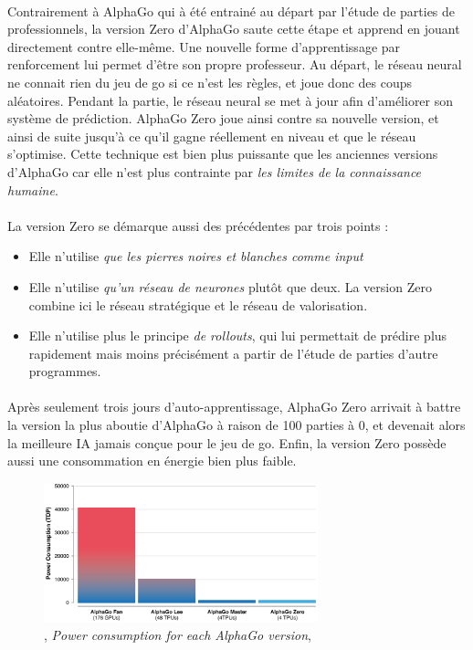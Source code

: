 \paragraph{} Contrairement à AlphaGo qui à été entrainé au départ par l'étude de parties de professionnels, la version Zero d'AlphaGo saute
cette étape et apprend en jouant directement contre elle-même. Une nouvelle forme \cite{AlphaGo2} d'apprentissage par renforcement lui permet
d'être son propre professeur. Au départ, le réseau neural ne connait rien du jeu de go si ce n'est les règles, et joue donc des coups aléatoires.
Pendant la partie, le réseau neural se met à jour afin d'améliorer son système de prédiction. AlphaGo Zero joue ainsi contre sa nouvelle version,
et ainsi de suite jusqu'à ce qu'il gagne réellement en niveau et que le réseau s'optimise. Cette technique est bien plus puissante que les anciennes
versions d'AlphaGo car elle n'est plus contrainte par \emph{les limites de la connaissance humaine}. 

\paragraph{} La version Zero se démarque aussi des précédentes par trois points :

\begin{itemize}
    \item Elle n'utilise \emph{que les pierres noires et blanches comme input}
    \item Elle n'utilise \emph{qu'un réseau de neurones} plutôt que deux. La version Zero combine ici le réseau stratégique et le réseau de valorisation.
    \item Elle n'utilise plus le principe \emph{de rollouts}, qui lui permettait de prédire plus rapidement mais moins précisément a partir de l'étude de parties d'autre programmes. 
\end{itemize}

\paragraph{} Après seulement trois jours d'auto-apprentissage, AlphaGo Zero arrivait à battre la version la plus aboutie d'AlphaGo à raison de 100 parties à 0,
et devenait alors la meilleure IA jamais conçue pour le jeu de go. Enfin, la version Zero possède aussi une consommation en énergie bien plus faible.

\begin{figure}[h]
    \centering
    \includegraphics[width=300px]{chapters/03/images/alphago-consumption.png}
    \caption{\label{comparatif}, \emph{Power consumption for each AlphaGo version}, \cite{AlphaGo2}}
\end{figure}

